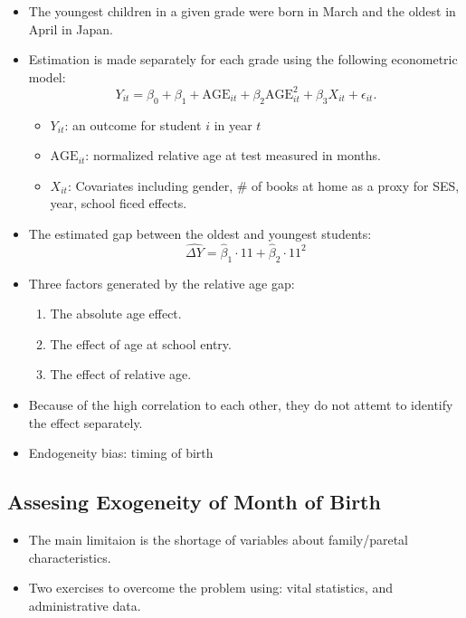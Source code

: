 \documentclass[../root]{subfiles}
\begin{document}
    \begin{itemize}
      \item The youngest children in a given grade were born in March and the oldest in April in Japan.
      \item Estimation is made separately for each grade using the following econometric model:
      \[
      Y_{it} = \beta_0 + \beta_1 + \text{AGE}_{it} + \beta_2 \text{AGE}_{it}^2 + \beta_3 X_{it} + \epsilon_{it}.
      \]
      \begin{itemize}
        \item $Y_{it}$: an outcome for student $i$ in year $t$
        \item $\text{AGE}_{it}$: normalized relative age at test measured in months.
        \item $X_{it}$: Covariates including gender, \# of books at home as a proxy for SES, year, school ficed effects.
      \end{itemize}
      \item The estimated gap between the oldest and youngest students:
      \[
      \hat{\Delta Y} = \hat{\beta}_1 \cdot 11 + \hat{\beta}_2 \cdot 11^2
      \]
      \item Three factors generated by the relative age gap:
      \begin{enumerate}
        \item The absolute age effect.
        \item The effect of age at school entry.
        \item The effect of relative age.
      \end{enumerate}
      \item Because of the high correlation to each other, they do not attemt to identify the effect separately.
      \item Endogeneity bias: timing of birth
    \end{itemize}

    \subsection{Assesing Exogeneity of Month of Birth}

    \begin{itemize}
      \item The main limitaion is the shortage of variables about family/paretal characteristics.
      \item Two exercises to overcome the problem using: vital statistics, and administrative data.
    \end{itemize}
\end{document}
